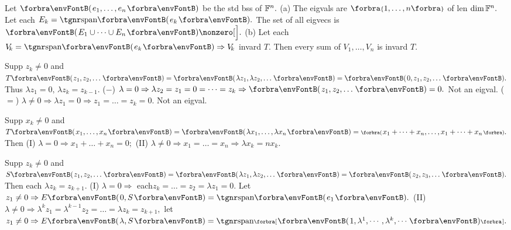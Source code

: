 Let $\Par{e_1,\dots,e_n}$ be the std bss of ${\mathbb{F}}^n.$\parSol{}
(a) The eigvals are $\Bra{1,\dots,n}$ of len $\dim{\mathbb{F}}^n.$ Let each $E_k=\Span{e_k}.$\parSol{\Ha}
The set of all eigvecs is $\Par{E_1\cup\cdots\cup E_n}\nonzero[\Big].$\parSol{}
(b) Let each $V_{\!k}=\Span{e_k}\Rightarrow V_{\!k}$ invard $T.$ Then every sum of $V_{\!1},\dots,V_{\!n}$ is invard $T.$\PfEnd
\SepLine

Supp $z_k\neq 0$ and $T\Par{z_1,z_2,\dots}=\Par{\lambda z_1,\lambda z_2,\dots}=\Par{0,z_1,z_2,\dots}.$ Thus $\lambda z_1=0,\,\lambda z_k=z_{k-1}.$\parSol{}
($-$) $\lambda=0\Rightarrow\lambda z_2=z_1=0=\dots=z_k\Rightarrow\Par{z_1,z_2,\dots}=0.$ Not an eigval.\parSol{}
($=$) $\lambda\neq 0\Rightarrow\lambda z_1=0\Rightarrow z_1=\dots=z_k=0.$ Not an eigval.\PfEnd
\SepLine

Supp $x_k\neq 0$ and $T\Par{x_1,\dots,x_n}=\Par{\lambda x_1,\dots,\lambda x_n}=\BigPar{x_1+\dots+x_n,\dots,x_1+\dots+x_n}.$\parSol{}
Then (I) $\lambda=0\Rightarrow x_1+\dots+x_n=0;$ \;(II) $\lambda\neq 0\Rightarrow x_1=\dots=x_n\Rightarrow\lambda x_k=n x_k.$
\SepLine

Supp $z_k\neq 0$ and $S\Par{z_1,z_2,\dots}=\Par{\lambda z_1,\lambda z_2,\dots}=\Par{z_2,z_3,\dots}.$ Then each $\lambda z_k=z_{k+1}.$\parSol{}
(I) $\lambda=0\Rightarrow$ each$z_k=\dots=z_2=\lambda z_1=0.$ Let $z_1\neq0\Rightarrow E\Par{0,S}=\Span{e_1}.$\parSol{}
(II) $\lambda\neq 0\Rightarrow\lambda^k z_1=\lambda^{k-1} z_2=\dots=\lambda z_k=z_{k+1},$ let $z_1\neq 0\Rightarrow E\Par{\lambda,S}=\Span[\Sbra]{\Par{1,\lambda^1,\cdots,\lambda^k,\cdots}}.$\PfEnd
\SepLine

